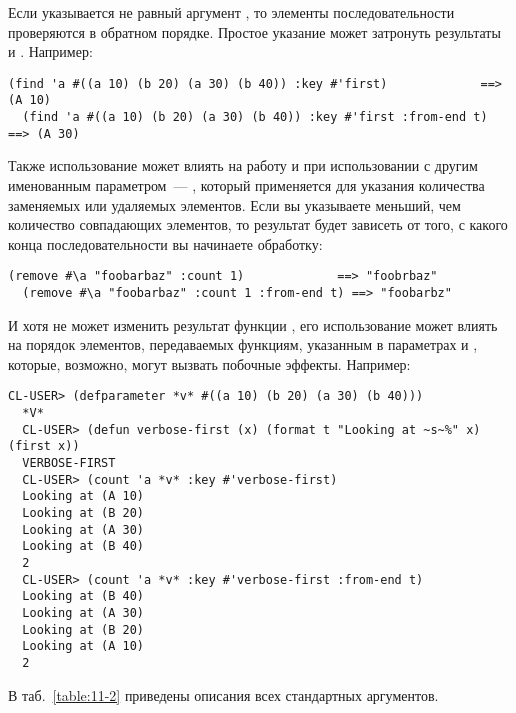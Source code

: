 Если указывается не равный  аргумент , то элементы
последовательности проверяются в обратном порядке.  Простое указание 
может затронуть результаты  и .  Например:

\begin{lstlisting}[style=lisprepl]
  (find 'a #((a 10) (b 20) (a 30) (b 40)) :key #'first)             ==> (A 10)
  (find 'a #((a 10) (b 20) (a 30) (b 40)) :key #'first :from-end t) ==> (A 30)
\end{lstlisting}

Также использование  может влиять на работу  и
 при использовании с другим именованным параметром~--- ,
который применяется для указания количества заменяемых или удаляемых элементов.  Если вы
указываете  меньший, чем количество совпадающих элементов, то результат будет
зависеть от того, с какого конца последовательности вы начинаете обработку:

\begin{lstlisting}[style=lisprepl]
  (remove #\a "foobarbaz" :count 1)             ==> "foobrbaz"
  (remove #\a "foobarbaz" :count 1 :from-end t) ==> "foobarbz"
\end{lstlisting}

И хотя  не может изменить результат функции , его
использование может влиять на порядок элементов, передаваемых функциям, указанным в
параметрах  и , которые, возможно, могут вызвать побочные эффекты.
Например:

\begin{lstlisting}[style=lisprepl]
  CL-USER> (defparameter *v* #((a 10) (b 20) (a 30) (b 40)))
  *V*
  CL-USER> (defun verbose-first (x) (format t "Looking at ~s~%" x) (first x))
  VERBOSE-FIRST
  CL-USER> (count 'a *v* :key #'verbose-first)
  Looking at (A 10)
  Looking at (B 20)
  Looking at (A 30)
  Looking at (B 40)
  2
  CL-USER> (count 'a *v* :key #'verbose-first :from-end t)
  Looking at (B 40)
  Looking at (A 30)
  Looking at (B 20)
  Looking at (A 10)
  2
\end{lstlisting}

В таб.~\ref{table:11-2} приведены описания всех стандартных аргументов.

